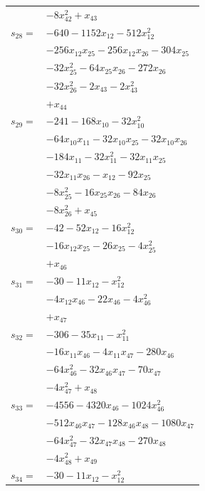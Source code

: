 \begin{longtable}{@{}r@{\;}l@{}}
 & \(\displaystyle -8x_{42}^{2} +x_{43}\) \\[3pt]
\(s_{28}=\) & \(\displaystyle -640 -1152x_{12} -512x_{12}^{2}\) \\
 & \(\displaystyle -256x_{12}x_{25} -256x_{12}x_{26} -304x_{25}\) \\
 & \(\displaystyle -32x_{25}^{2} -64x_{25}x_{26} -272x_{26}\) \\
 & \(\displaystyle -32x_{26}^{2} -2x_{43} -2x_{43}^{2}\) \\
 & \(\displaystyle +x_{44}\) \\[3pt]
\(s_{29}=\) & \(\displaystyle -241 -168x_{10} -32x_{10}^{2}\) \\
 & \(\displaystyle -64x_{10}x_{11} -32x_{10}x_{25} -32x_{10}x_{26}\) \\
 & \(\displaystyle -184x_{11} -32x_{11}^{2} -32x_{11}x_{25}\) \\
 & \(\displaystyle -32x_{11}x_{26} -x_{12} -92x_{25}\) \\
 & \(\displaystyle -8x_{25}^{2} -16x_{25}x_{26} -84x_{26}\) \\
 & \(\displaystyle -8x_{26}^{2} +x_{45}\) \\[3pt]
\(s_{30}=\) & \(\displaystyle -42 -52x_{12} -16x_{12}^{2}\) \\
 & \(\displaystyle -16x_{12}x_{25} -26x_{25} -4x_{25}^{2}\) \\
 & \(\displaystyle +x_{46}\) \\[3pt]
\(s_{31}=\) & \(\displaystyle -30 -11x_{12} -x_{12}^{2}\) \\
 & \(\displaystyle -4x_{12}x_{46} -22x_{46} -4x_{46}^{2}\) \\
 & \(\displaystyle +x_{47}\) \\[3pt]
\(s_{32}=\) & \(\displaystyle -306 -35x_{11} -x_{11}^{2}\) \\
 & \(\displaystyle -16x_{11}x_{46} -4x_{11}x_{47} -280x_{46}\) \\
 & \(\displaystyle -64x_{46}^{2} -32x_{46}x_{47} -70x_{47}\) \\
 & \(\displaystyle -4x_{47}^{2} +x_{48}\) \\[3pt]
\(s_{33}=\) & \(\displaystyle -4556 -4320x_{46} -1024x_{46}^{2}\) \\
 & \(\displaystyle -512x_{46}x_{47} -128x_{46}x_{48} -1080x_{47}\) \\
 & \(\displaystyle -64x_{47}^{2} -32x_{47}x_{48} -270x_{48}\) \\
 & \(\displaystyle -4x_{48}^{2} +x_{49}\) \\[3pt]
\(s_{34}=\) & \(\displaystyle -30 -11x_{12} -x_{12}^{2}\) \\

\end{longtable}
